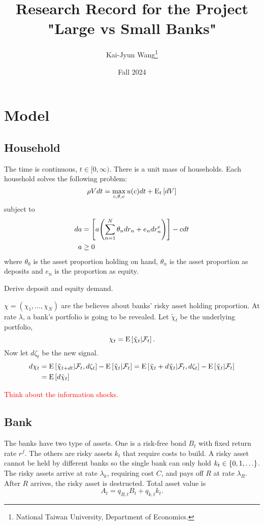\documentclass[a4paper, 12pt]{article}
\title{Research Record for the Project "Large vs Small Banks"}
\author{Kai-Jyun Wang\thanks{National Taiwan University, Department of Economics.}}
\date{Fall 2024}
\begin{document}
 
\maketitle

\section{Model} 
\subsection{Household}
The time is continuous, $t\in[0,\infty)$. There is a unit mass of households. 
Each household solves the following problem:
\begin{equation}
    \rho Vdt = \max_{c,\theta,e} u(c)dt + {\operatorname{E}}_t\left[ {dV} \right]
\end{equation}
subject to 
\begin{align}
    da &= \sbrc{a\pth{\sum_{n=1}^N\theta_ndr_n + e_ndr^e_n}} - cdt \\
    a &\geq 0
\end{align}
where $\theta_0$ is the asset proportion holding on hand, $\theta_n$ is the asset 
proportion as deposits and $e_n$ is the proportion as equity. 

Derive deposit and equity demand. 

$\chi = (\chi_1,\ldots,\chi_N)$ are the believes about 
banks' risky asset holding proportion. At rate $\lambda$, 
a bank's portfolio is going to be revealed. Let $\tilde{\chi}_t$ 
be the underlying portfolio, 
\begin{equation*}
    \chi_t = {\operatorname{E}}\left[ {\tilde{\chi}_t|\mathcal{F}_t} \right]. 
\end{equation*}
Now let $d\zeta_t$ be the new signal. 
\begin{equation*}
    \begin{split}
        d\chi_t &= {\operatorname{E}}\left[ {\tilde{\chi}_{t+dt}|\mathcal{F}_t,d\zeta_t} \right] - {\operatorname{E}}\left[ {\tilde{\chi}_t|\mathcal{F}_t} \right]
        = {\operatorname{E}}\left[ {\tilde{\chi}_t + d\tilde{\chi}_t|\mathcal{F}_t,d\zeta_t} \right] - {\operatorname{E}}\left[ {\tilde{\chi}_t|\mathcal{F}_t} \right] \\ 
        &= {\operatorname{E}}\left[ {d\tilde{\chi}_t} \right]
    \end{split}
\end{equation*}

\textcolor{red}{Think about the information shocks.}

\subsection{Bank} 
The banks have two type of assets. One is a risk-free bond $B_t$ with fixed 
return rate $r^f$. The others are risky assets $k_t$ that require costs to build. 
A risky asset cannot be held by different banks so the single bank can 
only hold $k_t\in\left\{ {0,1,\ldots} \right\}$. The risky assets arrive at rate $\lambda_k$, 
requiring cost $C$, and pays off $R$ at rate $\lambda_R$. After 
$R$ arrives, the risky asset is destructed. Total asset value is 
\begin{equation}
    A_t = q_{B,t}B_t + q_{k,t}k_t. 
\end{equation}
\end{document}
